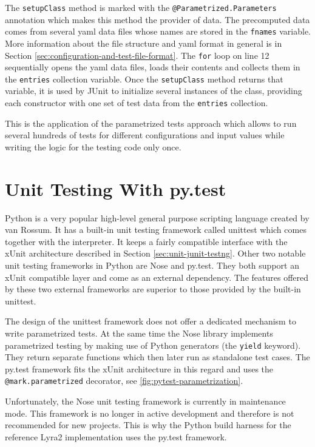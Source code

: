 The \texttt{setupClass} method is marked with the \texttt{@Parametrized.Parameters} annotation which makes this method the provider of data. The precomputed data comes from several \gls{yaml} data files whose names are stored in the \texttt{fnames} variable. More information about the file structure and \gls{yaml} format in general is in Section \ref{sec:configuration-and-test-file-format}. The \texttt{for} loop on line 12 sequentially opens the \gls{yaml} data files, loads their contents and collects them in the \texttt{entries} collection variable. Once the \texttt{setupClass} method returns that variable, it is used by JUnit to initialize several instances of the class, providing each constructor with one set of test data from the \texttt{entries} collection.

This is the application of the parametrized tests approach which allows to run several hundreds of tests for different configurations and input values while writing the logic for the testing code only once.

\section{Unit Testing With py.test}
\label{sec:unit-pytest}

Python is a very popular high-level general purpose scripting language created by van Rossum. It has a built-in unit testing framework called unittest which comes together with the interpreter. It keeps a fairly compatible interface with the xUnit architecture described in Section \ref{sec:unit-junit-testng}. Other two notable unit testing frameworks in Python are Nose and py.test. They both support an xUnit compatible layer and come as an external dependency. The features offered by these two external frameworks are superior to those provided by the built-in unittest.

The design of the unittest framework does not offer a dedicated mechanism to write parametrized tests. At the same time the Nose library implements parametrized testing by making use of Python generators (the \texttt{yield} keyword). They return separate functions which then later run as standalone test cases. The py.test framework fits the xUnit architecture in this regard and uses the \texttt{@mark.parametrized} decorator, see \autoref{fig:pytest-parametrization}.

Unfortunately, the Nose unit testing framework is currently in maintenance mode. This framework is no longer in active development and therefore is not recommended for new projects. This is why the Python build harness for the reference Lyra2 implementation uses the py.test framework.

